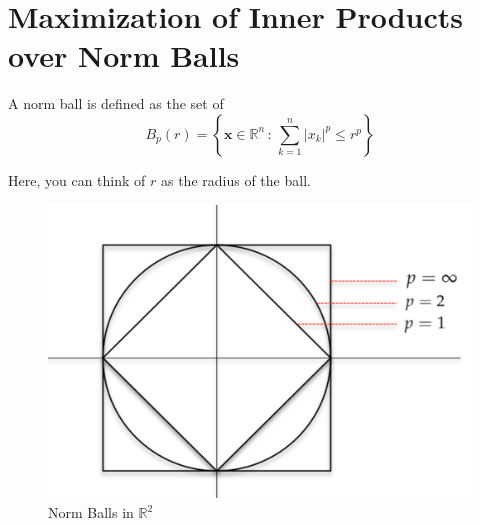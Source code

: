 \documentclass[12pt]{article}
\begin{document}
\section{Maximization of Inner Products over Norm Balls}
\begin{definition}
A norm ball is defined as the set of $$B_p(r) = \left\{\mathbf{x}\in\mathbb{R}^n\,:\,\sum_{k=1}^n |x_k|^p\leqslant r^p\right\}$$
\end{definition}
\noindent Here, you can think of $r$ as the radius of the ball.

 \begin{figure}[h!]\begin{center}\includegraphics[scale=0.35]{figures/lpnorms}\caption{Norm Balls in $\mathbb{R}^2$}\end{center}\end{figure}
\end{document}
